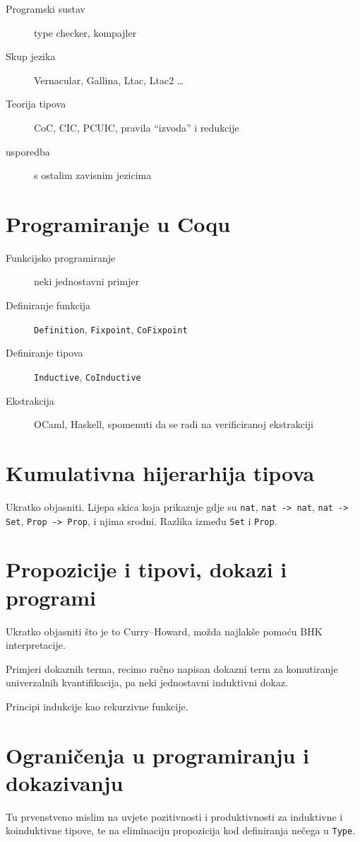 
\begin{description}             
\item[Programski sustav] type checker, kompajler
\item[Skup jezika] Vernacular, Gallina, Ltac, Ltac2 \ldots
\item[Teorija tipova] CoC, CIC, PCUIC, pravila ``izvoda'' i redukcije
\item[usporedba] s ostalim zavisnim jezicima
\end{description}

\section{Programiranje u Coqu}\label{sec:programiranje-u-coqu}
\begin{description}
\item[Funkcijsko programiranje] neki jednostavni primjer
\item[Definiranje funkcija] \texttt{Definition}, \texttt{Fixpoint}, \texttt{CoFixpoint}
\item[Definiranje tipova] \texttt{Inductive}, \texttt{CoInductive}
\item[Ekstrakcija] OCaml, Haskell, spomenuti da se radi na verificiranoj ekstrakciji
\end{description}

\section{Kumulativna hijerarhija tipova}\label{sec:kumul-hijer-tipova}
Ukratko objasniti. Lijepa skica koja prikazuje gdje su \texttt{nat}, \texttt{nat -> nat}, \texttt{nat -> Set}, \texttt{Prop -> Prop}, i njima srodni. Razlika između \texttt{Set} i \texttt{Prop}.

\section{Propozicije i tipovi, dokazi i programi}\label{sec:propozicije-i-tipovi}
Ukratko objasniti što je to Curry--Howard, možda najlakše pomoću BHK interpretacije.

Primjeri dokaznih terma, recimo ručno napisan dokazni term za komutiranje univerzalnih kvantifikacija, pa neki jednostavni induktivni dokaz.

Principi indukcije kao rekurzivne funkcije.

\section{Ograničenja u programiranju i dokazivanju}\label{sec:ogranicenja}
Tu prvenstveno mislim na uvjete pozitivnosti i produktivnosti za induktivne i koinduktivne tipove,
te na eliminaciju propozicija kod definiranja nečega u \texttt{Type}.

